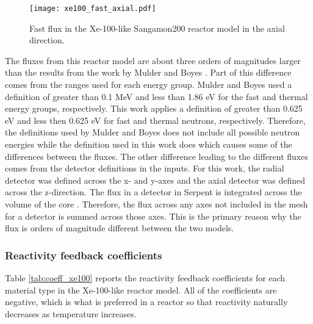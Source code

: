 \begin{figure}[ht]
        \centering 
        \texttt{[image: xe100\_fast\_axial.pdf]}
        \caption{Fast flux in the Xe-100-like Sangamon200 
        reactor model in the axial direction.}
        \label{fig:xe100_fast_axial}
\end{figure}

The fluxes from this reactor model are about three orders of 
magnitudes larger than the results from the work by Mulder and 
Boyes \cite{mulder_neutronics_2020}. Part of this difference comes 
from the ranges used for each energy group. Mulder and Boyes used 
a definition of greater than 0.1 MeV and less than 1.86 eV for the 
fast and thermal energy groups, respectively. This work applies a 
definition of greater than 0.625 eV and less then 0.625 eV for fast 
and thermal neutrons, respectively. Therefore, the definitions used by 
Mulder and Boyes does not include all possible neutron energies 
while the definition used in this work does which causes some of the 
differences between the fluxes. 
The other difference leading to the different fluxes comes from the detector 
definitions in the inputs. For this work, the radial detector 
was defined across the x- and y-axes and the axial detector was defined 
across the z-direction. The flux in a detector in Serpent is integrated 
across the volume of the core \cite{leppanen_serpent_2013}. Therefore, 
the flux across any axes not included in the mesh for a detector is 
summed across those axes. This is the primary reason why the flux is 
orders of magnitude different between the two models. 

\subsubsection{Reactivity feedback coefficients}
Table \ref{tab:coeff_xe100} reports the reactivity feedback 
coefficients for each material type in the Xe-100-like reactor model. 
All of the coefficients are negative, which is what is preferred in 
a reactor so that reactivity naturally decreases as temperature increases. 

